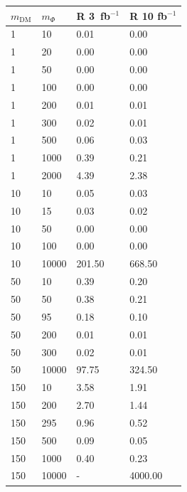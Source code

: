 \begin{table}[h!]
\small
\centering
\begin{minipage}{.45\textwidth}{
\begin{tabular}{llll}
\hline                      
 $m_\textrm{DM}$ & $m_\Phi$  & R 3~fb$^{-1}$ & R 10 fb$^{-1}$ \\ \hline

1  &       10  &      0.01  &    0.00 \\\hline
1  &       20  &      0.00  &    0.00 \\\hline
1  &       50  &      0.00  &    0.00 \\\hline
1  &       100  &     0.00  &    0.00 \\\hline
1  &       200  &     0.01  &    0.01 \\\hline
1  &       300  &     0.02  &    0.01 \\\hline
1  &       500  &     0.06  &    0.03 \\\hline
1  &       1000  &    0.39  &    0.21 \\\hline
1  &       2000  &    4.39  &    2.38 \\\hline
10  &      10  &      0.05  &    0.03 \\\hline
10  &      15  &      0.03  &    0.02 \\\hline
10  &      50  &      0.00  &    0.00 \\\hline
10  &      100  &     0.00  &    0.00 \\\hline
10  &      10000  &   201.50  &  668.50 \\\hline
50  &      10  &      0.39  &    0.20 \\\hline
50  &      50  &      0.38  &    0.21 \\\hline
50  &      95  &      0.18  &    0.10 \\\hline
50  &      200  &     0.01  &    0.01 \\\hline
50  &      300  &     0.02  &    0.01 \\\hline
50  &      10000  &   97.75  &   324.50 \\\hline
150  &     10  &      3.58  &    1.91 \\\hline
150  &     200  &     2.70  &    1.44 \\\hline
150  &     295  &     0.96  &    0.52 \\\hline
150  &     500  &     0.09  &    0.05 \\\hline
150  &     1000  &    0.40  &    0.23 \\\hline
150  &     10000  &   -     &  4000.00   \\ \hline

\end{tabular}}
\end{minipage}
\end{table}
